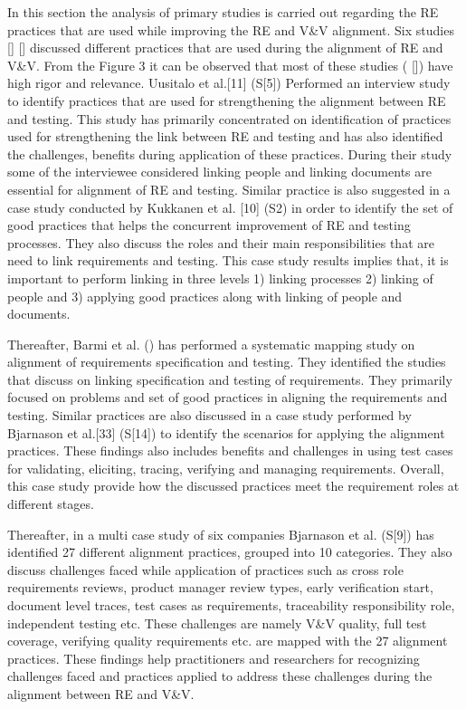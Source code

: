 \documentclass{article}
\begin{document}
In this section the analysis of primary studies is carried out regarding the RE practices that are used while improving the RE and V\&V alignment. 
Six studies \cite{barmi2011alignment} \cite{kukkanen2009applying} \cite{uusitalo2008linking} \cite{bjarnason2014challenges} [\cite{bjarnason2015industrial}] [\cite{bjarnason2014alignment}] discussed different practices that are used during the alignment of RE and V\&V. From the Figure 3 it can be observed that most of these studies (\cite{kukkanen2009applying} \cite{uusitalo2008linking} \cite{bjarnason2014challenges} [\cite{bjarnason2014alignment}]) have high rigor and relevance. Uusitalo et al.[11] (S[5]) Performed an interview study to identify practices that are used for strengthening the alignment between RE and testing. This study has primarily concentrated on identification of practices used for strengthening the link between RE and testing and has also identified the challenges, benefits during application of these practices. During their study some of the interviewee considered linking people and linking documents are essential for alignment of RE and testing. Similar practice is also suggested in a case study conducted by Kukkanen et al. [10] (S2\cite{bjarnason2014challenges}) in order to identify the set of good practices that helps the concurrent improvement of RE and testing processes.  They also discuss the roles and their main responsibilities that are need to link requirements and testing. This case study results implies that, it is important to perform linking in three levels 1) linking processes 2) linking of people and 3) applying good practices along with linking of people and documents.

Thereafter, Barmi et al. (\cite{barmi2011alignment}) has performed a systematic mapping study on alignment of requirements specification and testing. They identified the studies that discuss on linking specification and testing of requirements. They primarily focused on problems and set of good practices in aligning the requirements and testing. Similar practices are also discussed in a case study performed by Bjarnason et al.[33] (S[14]) to identify the scenarios for applying the alignment practices. These findings also includes benefits and challenges in using test cases for validating, eliciting, tracing, verifying and managing requirements. Overall, this case study provide how the discussed practices meet the requirement roles at different stages.

Thereafter, in a multi case study of six companies Bjarnason et al. \cite{bjarnason2014challenges} (S[9]) has identified 27 different alignment practices, grouped into 10 categories. They also discuss challenges faced while application of practices such as cross role requirements reviews, product manager review types, early verification start, document level traces, test cases as requirements, traceability responsibility role, independent testing etc. These challenges are namely V\&V quality, full test coverage, verifying quality requirements etc. are mapped with the 27 alignment practices. These findings help practitioners and researchers for recognizing challenges faced and practices applied to address these challenges during the alignment between RE and V\&V.  
\end{document}
